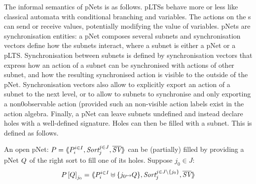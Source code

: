 \documentclass{lncs/llncs}
\begin{document}
The informal semantics of pNets is as follows. pLTSs behave more or less like  classical automata with conditional branching and variables. The actions on the \pLTS s can send or receive values, potentially modifying the value of variables. 
pNets are synchronisation entities: a pNet composes several subnets and  synchronisation vectors define how the subnets interact, where a subnet is either a pNet or a pLTS. Synchronisation between subnets is defined by synchronisation vectors that express how an action of a subnet can be synchronised with actions of other subnet, and how the resulting synchronised action is visible to the outside of the pNet. Synchronisation vectors also allow to explicitly export an action of a subnet to the next level, or to allow to subnets to synchronise and only exporting a non0observable action (provided such an non-visible action labels exist in the action algebra. Finally, a pNet can leave subnets undefined and instead declare holes with a well-defined signature. Holes can then be filled with a subnet. This is defined as follows.



\begin{definition}
	An open pNet: $\pNet = \mylangle \pNet_i^{i\in I}, \Sort_j^{j\in J}, 
	\set{\symb{SV}}\myrangle$
 can be (partially) filled by providing  a pNet $Q$ of the
	right sort to fill one of  its holes.	
	Suppose $j_0\in J$:
	\[\pNet\left[\pNetQ\right]_{j_0}= \mylangle 
	\pNet_i^{i\in I}\uplus\{j_0\mapsto \pNetQ\},\Sort_j^{j\in J\setminus \{j_0\}},
	\set{\symb{SV}}\myrangle
	\]
\end{definition}
\end{document}
